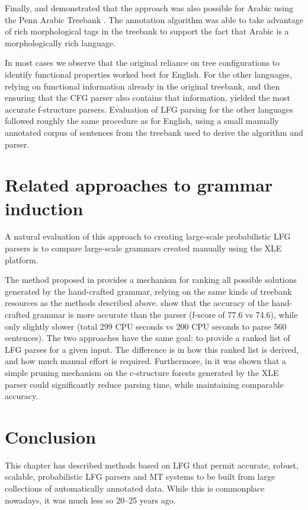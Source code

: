 \documentclass[output=paper,hidelinks]{langscibook}
\begin{document}
Finally, \citet{tounsi-etal-2009-automatic} and \citet{TounsiParsing:lfg09} demonstrated that the approach was also possible for Arabic using the Penn Arabic Treebank \citep{maamouri-bies-2004-developing}. The annotation algorithm was able to take advantage of rich morphological tags in the treebank to support the fact that Arabic is a morphologically rich language. 

In most cases we observe that the original reliance on tree configurations to identify functional properties worked best for English. For the other languages, relying on functional information already in the original treebank, and then ensuring that the CFG parser also contains that information, yielded the most accurate f-structure parsers. Evaluation of LFG parsing for the other languages followed roughly the same procedure as for English, using a small manually annotated corpus of sentences from the treebank used to derive the algorithm and parser. 

\section{Related approaches to grammar induction}
A natural evaluation of this approach to creating large-scale probabilistic LFG parsers is to compare large-scale grammars created manually using the XLE platform. 

The method proposed in \citet{Riezler2002King} provides a mechanism for ranking all possible solutions generated by the hand-crafted grammar, relying on the same kinds of treebank resources as the methods described above. \citet{kaplanetal04} show that the accuracy of the hand-crafted grammar is more accurate than the \citet{collins1999head} parser (f-score of 77.6 vs 74.6), while only slightly slower (total 299 CPU seconds vs 200 CPU seconds to parse 560 sentences). The two approaches have the same goal: to provide a ranked list of LFG parses for a given input. The difference is in how this ranked list is derived, and how much manual effort is required. Furthermore, in \citet{cahill-etal-2008-speeding} it was shown that a simple pruning mechanism on the c-structure forests generated by the XLE parser could significantly reduce parsing time, while maintaining comparable accuracy. 


\section{Conclusion}
This chapter has described methods based on LFG that permit accurate, robust, scalable, probabilistic LFG parsers and MT systems to be built from large collections of automatically annotated data. While this is commonplace nowadays, it was much less so 20--25 years ago.
\end{document}
